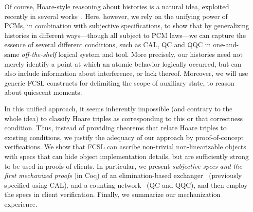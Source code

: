 Of course, Hoare-style reasoning about histories is a natural idea,
exploited recently in several
works~\cite{Fu-al:CONCUR10,Gotsman-al:ESOP13,Bell-al:SAS10,Hemed-al:DISC15}. Here,
however, we rely on the unifying power of PCMs, in combination with
subjective specifications, to show that by generalizing histories in
different ways---though all subject to PCM laws---we can capture the
essence of several different conditions, such as CAL, QC and QQC in
one-and-same \emph{off-the-shelf} logical system and tool.
%
More precisely, our histories need not merely identify a point at
which an atomic behavior logically occurred, but can also include
information about interference, or lack thereof. Moreover, we will use
generic FCSL constructs for delimiting the scope of auxiliary state,
to reason about quiescent moments.
%
%

In this unified approach, it seems inherently impossible (and contrary
to the whole idea) to classify Hoare triples as corresponding to this
or that correctness condition. Thus, instead of providing theorems
that relate Hoare triples to existing conditions, we justify the
adequacy of our approach by proof-of-concept verifications. We show
that FCSL can ascribe non-trivial non-linearizable objects with specs
that can hide object implementation details, but are sufficiently
strong to be used in proofs of clients.
%
In particular, we present \emph{subjective specs and the first
  mechanized proofs} (in Coq) of an elimination-based
exchanger~\cite{Scherer-al:SCOOL05} (previously specified using CAL),
and a counting network~\cite{Aspnes-al:JACM94} (QC and QQC), and then
employ the specs in client verification.
Finally, we summarize our mechanization experience.
%

